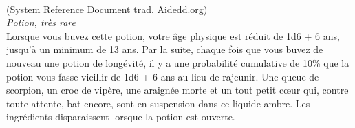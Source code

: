 \\
{\small (System Reference Document trad. Aidedd.org)}\\
{\small \it Potion, très rare}\\
Lorsque vous buvez cette potion, votre âge physique est réduit de 1d6 + 6 ans, jusqu'à un minimum de 13 ans. Par la suite, chaque fois que vous buvez de nouveau une potion de longévité, il y a une probabilité cumulative de 10\% que la potion vous fasse vieillir de 1d6 + 6 ans au lieu de rajeunir. Une queue de scorpion, un croc de vipère, une araignée morte et un tout petit cœur qui, contre toute attente, bat encore, sont en suspension dans ce liquide ambre. Les ingrédients disparaissent lorsque la potion est ouverte. \\

